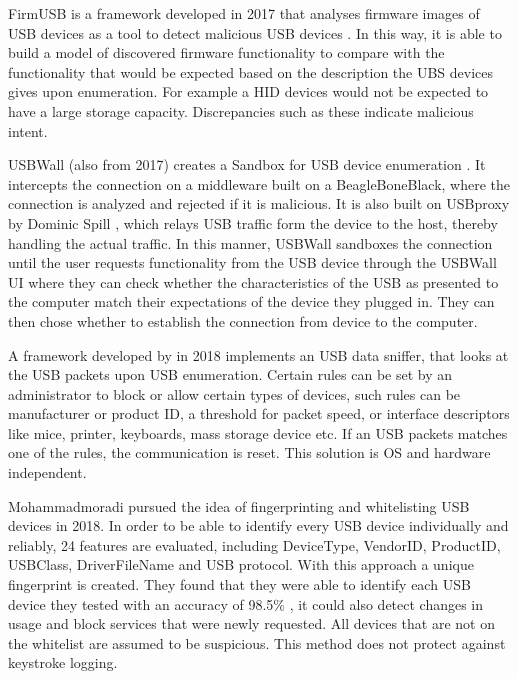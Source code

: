 FirmUSB is a framework developed in 2017 that analyses firmware images of USB devices as a tool to detect malicious USB devices \cite{hernandezFirmUSBVettingUSB2017}. In this way, it is able to build a model of discovered firmware functionality to compare with the functionality that would be expected based on the description the UBS devices gives upon enumeration. For example a HID devices would not be expected to have a large storage capacity. Discrepancies such as these indicate malicious intent. 

USBWall (also from 2017) creates a Sandbox for USB device enumeration \cite{kangUSBWallNovelSecurity2017}. It intercepts the connection on a middleware built on a BeagleBoneBlack, where the connection is analyzed and rejected if it is malicious. It is also built on USBproxy by Dominic Spill \cite{dominicspillShmooCon2014Open2014}, which relays USB traffic form the device to the host, thereby handling the actual traffic. In this manner, USBWall sandboxes the connection until the user requests functionality from the USB device through the USBWall UI where they can check whether the characteristics of the USB as presented to the computer match their expectations of the device they plugged in. They can then chose whether to establish the connection from device to the computer.  

A framework developed by \cite{erdinOSIndependentHardwareAssisted2018} in 2018 implements an USB data sniffer, that looks at the USB packets upon USB enumeration. Certain rules can be set by an administrator to block or allow certain types of devices, such rules can be manufacturer or product ID, a threshold for packet speed, or interface descriptors like mice, printer, keyboards, mass storage device etc. If an USB packets matches one of the rules, the communication is reset. This solution is OS and hardware independent. 

Mohammadmoradi \cite{mohammadmoradiMakingWhitelistingBasedDefense2018} pursued the idea of fingerprinting and whitelisting USB devices in 2018. In order to be able to identify every USB device individually and reliably, 24 features are evaluated, including DeviceType, VendorID, ProductID, USBClass, DriverFileName and USB protocol. With this approach a unique fingerprint is created. They found that they were able to identify each USB device they tested with an accuracy of 98.5\% , it could also detect changes in usage and block services that were newly requested. All devices that are not on the whitelist are assumed to be suspicious. This method does not protect against keystroke logging. 

